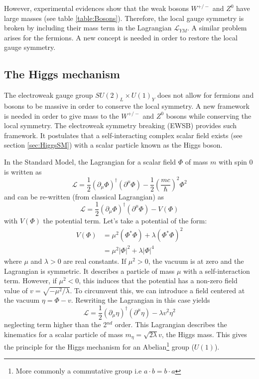 However, experimental evidences \cite{Rubbia:1983pta} show that the weak bosons $W^{+/-}$ and $Z^0$ have large masses (see table \ref{table:Bosons}). Therefore, the local gauge symmetry is broken by including their mass term in the Lagrangian $\mathcal{L}_{YM}$. A similar problem arises for the fermions. A new concept is needed in order to restore the local gauge symmetry.

\subsection{The Higgs mechanism}
\label{subsec:HiggsMecha}

The electroweak gauge group $SU(2)_{L} \times U(1)_{Y}$ does not allow for fermions and bosons to be massive in order to conserve the local symmetry. A new framework is needed in order to give mass to the $W^{+/-}$ and $Z^0$ bosons while conserving the local symmetry. The electroweak symmetry breaking (EWSB) provides such framework. It postulates that a self-interacting complex scalar field exists (see section \ref{sec:HiggsSM}) with a scalar particle known as the Higgs boson.

In the Standard Model, the Lagrangian for a scalar field $\Phi$ of mass $m$ with spin 0 is written as \cite{Griffiths:343277}
\begin{equation}
  \mathcal{L} = \frac{1}{2}(\partial_{\mu}\Phi)^{\dagger}(\partial^{\mu}\Phi) - \frac{1}{2}\left(\frac{mc}{\hbar}\right)^2\Phi^2
\end{equation}
and can be re-written (from classical Lagrangian) as
\begin{equation} \label{eq:HiggsLag}
  \mathcal{L} = \frac{1}{2}(\partial_{\mu}\Phi)^{\dagger}(\partial^{\mu}\Phi) - V(\Phi)
\end{equation}
with $V(\Phi)$ the potential term. Let's take a potential of the form:
\begin{equation}
  \begin{aligned}
    V(\Phi) & = \mu^2(\Phi^*\Phi) + \lambda(\Phi^*\Phi)^2 \\
    & = \mu^2|\Phi|^2 + \lambda|\Phi|^4
  \end{aligned}
\end{equation}
where $\mu$ and $\lambda > 0$ are real constants. If $\mu^2 > 0$, the vacuum is at zero and the Lagrangian is symmetric. It describes a particle of mass $\mu$ with a self-interaction term. However, if $\mu^2 < 0$, this induces that the potential has a non-zero field value of $v = \sqrt{-\mu^2/\lambda}$. To circumvent this, we can introduce a field centered at the vacuum $\eta = \Phi - v$. Rewriting the Lagrangian in this case yields
\begin{equation}
  \mathcal{L} = \frac{1}{2}(\partial_{\mu}\eta)^{\dagger}(\partial^{\mu}\eta) - \lambda v^2\eta^2
\end{equation}
neglecting term higher than the 2$^{nd}$ order. This Lagrangian describes the kinematics for a scalar particle of mass $m_{\eta} = \sqrt{2\lambda}v$, the Higgs mass. This gives the principle for the Higgs mechanism for an Abelian\footnote{More commonly a commutative group i.e $a \cdot b = b \cdot a$} group ($U(1)$).

